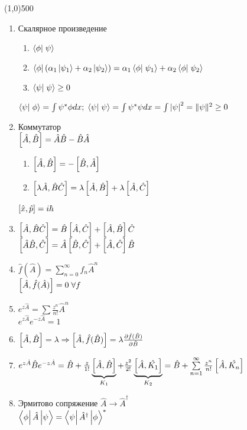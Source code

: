 


\fontsize{20}{24}
\line(1,0){500}
\fontsize{12}{15}
\begin{enumerate}
\item Скалярное произведение
	\begin{enumerate}
	      \item $\braket{\phi}{\psi}$
            \item $\bra{\phi}(\alpha_1\ket{\psi_1}+\alpha_2\ket{\psi_2})=\alpha_1\braket{\phi}{\psi_1}+\alpha_2\braket{\phi}{\psi_2}$
            \item $\braket{\psi}{\psi}\geq 0$
	\end{enumerate}
      $\braket{\psi}{\phi}=\int\psi^*\phi dx;\;\braket{\psi}{\psi}=\int\psi^*\psi dx =\int\abs{\psi}^2=\qnorm{\psi}\geq 0$
\item Коммутатор\\
      $\left[ \hat{A}, \hat{B} \right]=\hat{A}\hat{B}-\hat{B}\hat{A}$
      \begin{enumerate}
            \item $ \left[ \hat{A}, \hat{B} \right]=-\left[ \hat{B}, \hat{A} \right] $
            \item $ \left[ \lambda\hat{A},\hat{B}\hat{C} \right] = \lambda\left[ \hat{A}, \hat{B} \right] + \lambda\left[ \hat{A}, \hat{C} \right] $
      \end{enumerate}
      $\left[ \hat{x}, \hat{p} \right]=i\hbar$
\item $ \left[ \hat{A}, \hat{B}\hat{C} \right] = \hat{B}\left[ \hat{A}, \hat{C} \right] + \left[ \hat{A}, \hat{B} \right]\hat{C} $\\
      $ \left[ \hat{A}\hat{B}, \hat{C} \right] = \hat{A}\left[ \hat{B}, \hat{C} \right] + \left[ \hat{A}, \hat{C} \right]\hat{B} $
\item $ \hat{f}(\hat{A})=\sum\limits_{n=0}^{\infty}f_n \hat{A}^n $\\
      $\left[ \hat{A}, \hat{f}(\hat{A}) \right] = 0\;\forall f $
\item $ e^{z\hat{A}}=\sum \frac{z^n}{n!}\hat{A}^n $ \\
      $ e^{z\hat{A}}e^{-z\hat{A}} = 1 $
\item $ \left[ \hat{A}, \hat{B} \right]=\lambda \Rightarrow \left[ \hat{A}, \hat{f}(\hat{B}) \right]=\lambda \frac{\partial \hat{f}(\hat{B})}{\partial \hat{B}} $
\item $ e^{z\hat{A}}\hat{B}e^{-z\hat{A}} = \hat{B} + \frac{z}{1!}\underbrace{\left[ \hat{A}, \hat{B} \right]}_{K_1} + \frac{z^2}{2!}\underbrace{\left[ \hat{A}, \hat{K_1} \right]}_{K_2} = \hat{B}+\sum\limits_{n=1}^{\infty}\frac{z^n}{n!}\left[ \hat{A}, \hat{K_n} \right] $
\item Эрмитово сопряжение $\hat{A}\rightarrow\hat{A}^\dagger $\\
      $ \matrixel{\phi}{\hat{A}}{\psi} = \matrixel{\psi}{\hat{A}^\dagger}{\phi}^* $\\

\end{enumerate}
